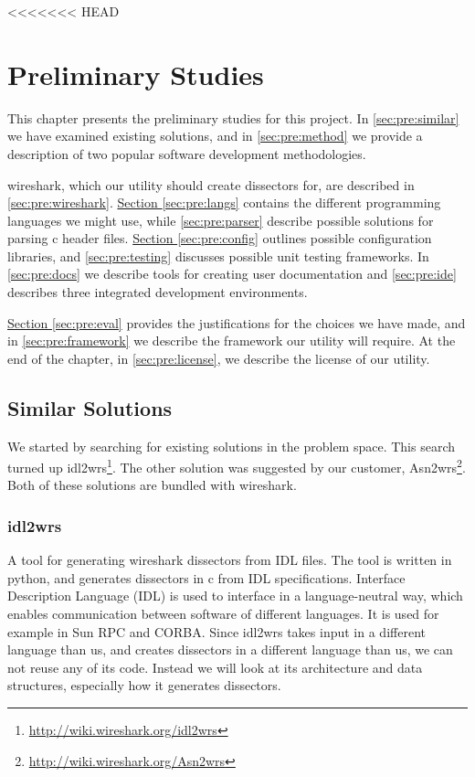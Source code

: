 <<<<<<< HEAD
\chapter{Preliminary Studies}
This chapter presents the preliminary studies for this project.
In \autoref{sec:pre:similar} we have examined existing solutions, and in
\autoref{sec:pre:method} we provide a description of two popular software
development methodologies.

\Gls{wireshark}, which our \gls{utility} should create \glspl{dissector} for, are described in
\autoref{sec:pre:wireshark}.
\hyperref[sec:pre:langs]{Section \ref*{sec:pre:langs}} contains the different
programming languages we might use, while \autoref{sec:pre:parser}
describe possible solutions for parsing \Gls{c} \gls{header} files.
\hyperref[sec:pre:config]{Section \ref*{sec:pre:config}} outlines possible
configuration libraries, and \autoref{sec:pre:testing} discusses possible unit
testing frameworks. In \autoref{sec:pre:docs} we describe tools for creating
user documentation and \autoref{sec:pre:ide} describes three integrated
development environments.

\hyperref[sec:pre:eval]{Section \ref*{sec:pre:eval}} provides the
justifications for the choices we have made, and in
\autoref{sec:pre:framework} we describe the framework our \gls{utility} will require.
At the end of the chapter, in \autoref{sec:pre:license}, we describe the
license of our \gls{utility}.


\section{Similar Solutions}
\label{sec:pre:similar}
We started by searching for existing solutions in the problem space. This
search turned up idl2wrs\footnote{\url{http://wiki.wireshark.org/idl2wrs}}.
The other solution was suggested by our customer,
Asn2wrs\footnote{\url{http://wiki.wireshark.org/Asn2wrs}}.
Both of these solutions are bundled with \Gls{wireshark}.

\subsection{idl2wrs}
A tool for generating \Gls{wireshark} \glspl{dissector} from IDL files. The tool is written
in \Gls{python}, and generates \glspl{dissector} in \Gls{c} from IDL specifications. Interface
Description Language (IDL) is used to interface in a language-neutral way,
which enables communication between software of different languages. It is
used for example in Sun RPC and CORBA. Since idl2wrs takes input in a different
language than us, and creates \glspl{dissector} in a different language than us, we
can not reuse any of its code. Instead we will look at its architecture and
data structures, especially how it generates \glspl{dissector}.

